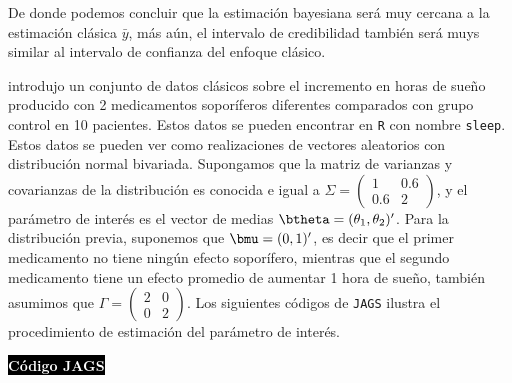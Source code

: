 De donde podemos concluir que la estimación bayesiana será muy cercana a la estimación clásica $\bar{y}$, más aún, el intervalo de credibilidad también será muys similar al intervalo de confianza del enfoque clásico.

\begin{Eje}\label{Eje_Student}
 introdujo un conjunto de datos clásicos sobre el incremento en horas de sueño producido con 2 medicamentos soporíferos diferentes comparados con grupo control en 10 pacientes. Estos datos se pueden encontrar en \verb'R' con nombre \verb'sleep'. Estos datos se pueden ver como realizaciones de vectores aleatorios con distribución normal bivariada. Supongamos que la matriz de varianzas y covarianzas de la distribución es conocida e igual a $\Sigma=\begin{pmatrix}1&0.6\\ 0.6&2\end{pmatrix}$, y el parámetro de interés es el vector de medias $\btheta=(\theta_1,\theta_2)'$. Para la distribución previa, suponemos que $\bmu=(0,1)'$, es decir que el primer medicamento no tiene ningún efecto soporífero, mientras que el segundo medicamento tiene un efecto promedio de aumentar 1 hora de sueño, también asumimos que $\Gamma=\begin{pmatrix}2&0\\ 0&2\end{pmatrix}$. Los siguientes códigos de \verb'JAGS' ilustra el procedimiento de estimación del parámetro de interés.

\colorbox{black}{\textcolor{white}{\textbf{C\'odigo JAGS}}}
\begin{knitrout}
\color{fgcolor}\begin{kframe}
\begin{alltt}
 \hlkwb{<-} 
\hlkwb{<-} \hlstd{(}\hlstd{(}\hlstd{,} \hlkwb{<-} \hlstd{(}\hlstd{(}\hlstd{,}\hlstd{,}\hlstd{,}\hlstd{),}\hlstd{,}\hlstd{)}
  \hlkwb{<-} \hlstd{(}\hlstd{(}\hlstd{,}\hlstd{,}\hlstd{,}\hlstd{),}\hlstd{,} \hlkwb{<-} 

 \hlkwb{<-} \hlstd{()\{}
   \hlopt{:} 
\hlstd{\{}
  \hlstd{y[i,} \hlopt{:}\hlstd{]} \hlopt{~} 
\hlstd{\}}
\hlstd{theta[}\hlopt{:}\hlstd{]} \hlopt{~} 
\hlstd{\}}


\end{alltt}
\end{kframe}
\end{knitrout}
\end{Eje}
